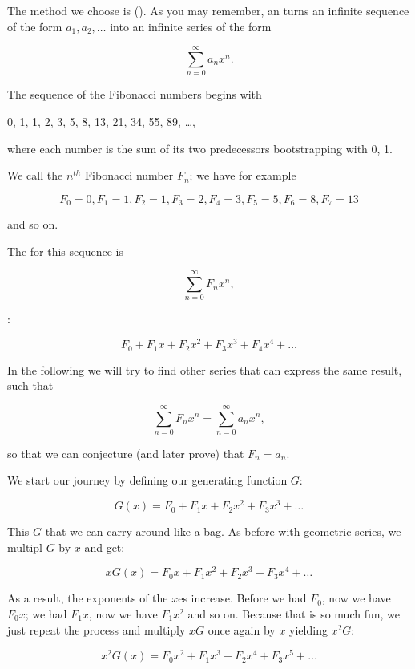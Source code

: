 \documentclass[tikz]{scrreprt}
\begin{document}
The method we choose is 
().
As you may remember, an 
turns an infinite sequence of the form
$a_1,a_2,\dots$
into an infinite series of the form

\[
\sum_{n=0}^{\infty}{a_nx^n}.
\]

The sequence of the Fibonacci numbers begins with

0, 1, 1, 2, 3, 5, 8, 13, 21, 34, 55, 89, \dots,

where each number is the sum of its two predecessors 
bootstrapping with 0, 1.

We call the $n^{th}$ Fibonacci number $F_n$;
we have for example

\[
F_0 = 0, 
F_1 = 1, 
F_2 = 1, 
F_3 = 2, 
F_4 = 3, 
F_5 = 5, 
F_6 = 8, 
F_7 = 13
\]

and so on.

The  for this sequence is

\[
\sum_{n=0}^{\infty}{F_nx^n},
\]

\ie:

\[
F_0 + F_1x + F_2x^2 + F_3x^3 + F_4x^4 + \dots
\]

In the following we will try to find other series
that can express the same result, such that

\begin{equation}
\sum_{n=0}^{\infty}{F_nx^n} =
\sum_{n=0}^{\infty}{a_nx^n},
\end{equation}

so that we can conjecture (and later prove)
that $F_n = a_n$.

We start our journey by defining our generating function $G$:

\begin{equation}
G(x) = F_0 + F_1x + F_2x^2 + F_3x^3 + \dots
\end{equation}

This $G$ that we can carry around like a bag.
As before with geometric series, we multipl
$G$ by $x$ and get:

\begin{equation}
xG(x) = F_0x + F_1x^2 + F_2x^3 + F_3x^4 + \dots
\end{equation}

As a result, the exponents of the $x$es increase.
Before we had $F_0$, now we have $F_0x$;
we had $F_1x$, now we have $F_1x^2$ and so on.
Because that is so much fun, we just repeat
the process and multiply $xG$ once again
by $x$ yielding $x^2G$:

\begin{equation}
x^2G(x) = F_0x^2 + F_1x^3 + F_2x^4 + F_3x^5 + \dots
\end{equation}
\end{document}
